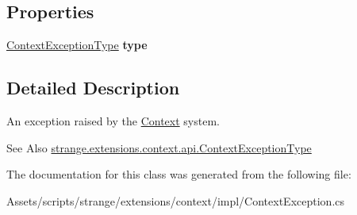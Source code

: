 \subsection*{Properties}
\begin{DoxyCompactItemize}
\item 
\hypertarget{classstrange_1_1extensions_1_1context_1_1impl_1_1_context_exception_ad053db1d001cdf99851d92038c86740e}{\hyperlink{namespacestrange_1_1extensions_1_1context_1_1api_a60b937d6295cc72fe4b26e4f9d671283}{Context\-Exception\-Type} {\bfseries type}}\label{classstrange_1_1extensions_1_1context_1_1impl_1_1_context_exception_ad053db1d001cdf99851d92038c86740e}

\end{DoxyCompactItemize}


\subsection{Detailed Description}
An exception raised by the \hyperlink{classstrange_1_1extensions_1_1context_1_1impl_1_1_context}{Context} system. 

\begin{DoxySeeAlso}{See Also}
\hyperlink{namespacestrange_1_1extensions_1_1context_1_1api_a60b937d6295cc72fe4b26e4f9d671283}{strange.\-extensions.\-context.\-api.\-Context\-Exception\-Type} 
\end{DoxySeeAlso}


The documentation for this class was generated from the following file\-:\begin{DoxyCompactItemize}
\item 
Assets/scripts/strange/extensions/context/impl/Context\-Exception.\-cs\end{DoxyCompactItemize}
